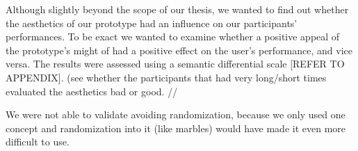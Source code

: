 Although slightly beyond the scope of our thesis, we wanted to find out whether the aesthetics of our prototype had an influence on our participants' performances. To be exact we wanted to examine whether a positive appeal of the prototype's might of had a positive effect on the user's performance, and vice versa. The results were assessed using a semantic differential scale [REFER TO APPENDIX]. (see whether the participants that had very long/short times evaluated the aesthetics bad or good.  //


We were not able to validate avoiding randomization, because we only used one concept and randomization into it (like marbles) would have made it even more difficult to use. 

